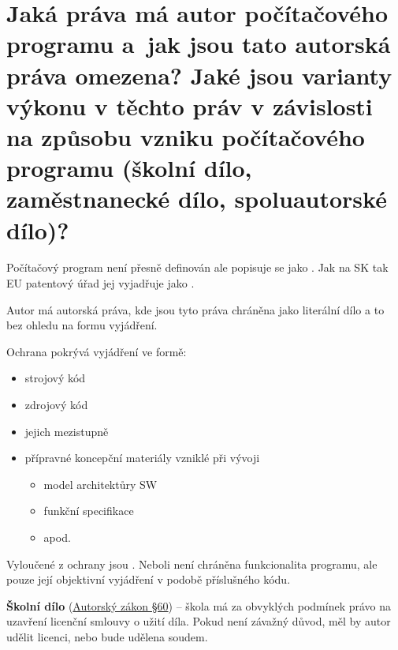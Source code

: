 \section{Jaká práva má autor počítačového programu a~jak jsou tato autorská práva omezena? Jaké jsou varianty výkonu v těchto práv v závislosti na způsobu vzniku počítačového programu (školní dílo, zaměstnanecké dílo, spoluautorské dílo)?}

Počítačový program není přesně definován ale popisuje se jako . Jak na SK tak EU patentový úřad jej vyjadřuje jako .

Autor má autorská práva, kde jsou tyto práva chráněna jako literální dílo a to bez ohledu na formu vyjádření.
\newline

\noindent Ochrana pokrývá vyjádření ve formě:
\begin{itemize}[noitemsep]
    \item strojový kód
    \item zdrojový kód
    \item jejich mezistupně
    \item přípravné koncepční materiály vzniklé při vývoji
    \begin{itemize}[noitemsep]
        \item model architektůry SW
        \item funkční specifikace
        \item apod.
    \end{itemize}
\end{itemize}

Vyloučené z ochrany jsou . Neboli není chráněna funkcionalita programu, ale pouze její objektivní vyjádření v podobě příslušného kódu.

\textbf{Školní dílo} (\href{https://www.zakonyprolidi.cz/cs/2000-121#p60}{Autorský zákon §60}) -- škola má za obvyklých podmínek právo na uzavření licenční smlouvy o užití díla. Pokud není závažný důvod, měl by autor udělit licenci, nebo bude udělena soudem.

